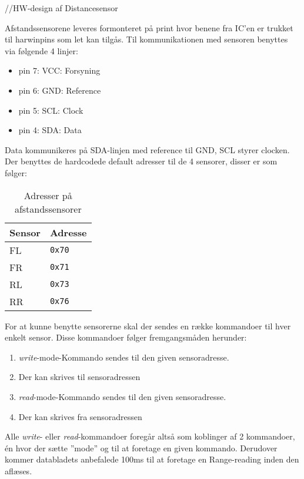 //HW-design af Distancesensor

Afstandssensorene leveres formonteret på print hvor benene fra IC'en er trukket til harwinpins som let kan tilgås. Til kommunikationen med sensoren benyttes \IIC via følgende 4 linjer: 

\begin{itemize}
	\item pin 7: VCC: Forsyning
	\item pin 6: GND: Reference
	\item pin 5: SCL: Clock
	\item pin 4: SDA: Data
\end{itemize}

Data kommunikeres på SDA-linjen med reference til GND,  SCL styrer clocken.
Der benyttes de hardcodede default adresser til de 4 sensorer, disser er som følger: 

\begin{table}[h]\centering
	\begin{tabular}{| l | l |} \hline
		\textbf{Sensor} 	& \textbf{Adresse}  \\\hline
		FL 					& \texttt{0x70} 	\\\hline
		FR 					& \texttt{0x71} 	\\\hline
		RL 					& \texttt{0x73} 	\\\hline
		RR 					& \texttt{0x76} 	\\\hline
	\end{tabular}
	\caption{Adresser på afstandssensorer}
	\label{table:adr_afstandssensorer}
\end{table}

For at kunne benytte sensorerne skal der sendes en række kommandoer til hver enkelt sensor. Disse kommandoer følger fremgangsmåden herunder:

\begin{enumerate}
  \item \textit{write}-mode-Kommando sendes til den given sensoradresse.
  \item Der kan skrives til sensoradressen
  \item \textit{read}-mode-Kommando sendes til den given sensoradresse.
  \item Der kan skrives fra sensoradressen
\end{enumerate}

Alle \textit{write}- eller \textit{read}-kommandoer foregår altså som koblinger af 2 kommandoer, én hvor der sætte ''mode'' og til at foretage en given kommando. Derudover kommer databladets anbefalede 100ms til at foretage en Range-reading inden den aflæses.

